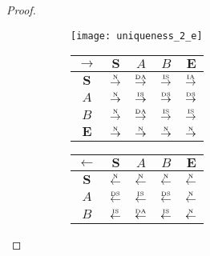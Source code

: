 \begin{proof}
\begin{figure}[htbp]
  \begin{subfigure}{1\textwidth}
    \vspace{1em}
    \centering
    \begin{minipage}[b]{1\textwidth}
      \centering
      \texttt{[image: uniqueness\_2\_e]}
    \end{minipage}
    \begin{minipage}[b]{0.3\textwidth}
      \vspace{1em}
      \centering
      \begin{tabular}{|c|c|c|c|c|} \hline
        $\rightarrow$ & $\bm{S}$ & $A$ & $B$ & $\bm{E}$\\ \hline
        $\bm{S}$ & $\overset{\text{\tiny{N}}}{\rightarrow}$ & $\overset{\text{\tiny{DA}}}{\rightarrow}$ & $\overset{\text{\tiny{IS}}}{\rightarrow}$ & $\overset{\text{\tiny{IA}}}{\rightarrow}$\\ \hline
        $A$ & $\overset{\text{\tiny{N}}}{\rightarrow}$ & $\overset{\text{\tiny{IS}}}{\rightarrow}$ & $\overset{\text{\tiny{DS}}}{\rightarrow}$ & $\overset{\text{\tiny{DS}}}{\rightarrow}$\\ \hline
        $B$ & $\overset{\text{\tiny{N}}}{\rightarrow}$ & $\overset{\text{\tiny{DA}}}{\rightarrow}$ & $\overset{\text{\tiny{IS}}}{\rightarrow}$ & $\overset{\text{\tiny{IS}}}{\rightarrow}$\\ \hline
        $\bm{E}$ & $\overset{\text{\tiny{N}}}{\rightarrow}$ & $\overset{\text{\tiny{N}}}{\rightarrow}$ & $\overset{\text{\tiny{N}}}{\rightarrow}$ & $\overset{\text{\tiny{N}}}{\rightarrow}$\\ \hline
      \end{tabular}
    \end{minipage}
    \begin{minipage}[b]{0.3\textwidth}
      \vspace{1em}
      \centering
      \begin{tabular}{|c|c|c|c|c|} \hline
        $\leftarrow$ & $\bm{S}$ & $A$ & $B$ & $\bm{E}$\\ \hline
        $\bm{S}$ & $\overset{\text{\tiny{N}}}{\leftarrow}$ & $\overset{\text{\tiny{N}}}{\leftarrow}$ & $\overset{\text{\tiny{N}}}{\leftarrow}$ & $\overset{\text{\tiny{N}}}{\leftarrow}$\\ \hline
        $A$ & $\overset{\text{\tiny{DS}}}{\leftarrow}$ & $\overset{\text{\tiny{IS}}}{\leftarrow}$ & $\overset{\text{\tiny{DS}}}{\leftarrow}$ & $\overset{\text{\tiny{N}}}{\leftarrow}$\\ \hline
        $B$ & $\overset{\text{\tiny{IS}}}{\leftarrow}$ & $\overset{\text{\tiny{DA}}}{\leftarrow}$ & $\overset{\text{\tiny{IS}}}{\leftarrow}$ & $\overset{\text{\tiny{N}}}{\leftarrow}$\\ \hline

\end{tabular}
\end{minipage}
\end{subfigure}
\end{figure}
\end{proof}

